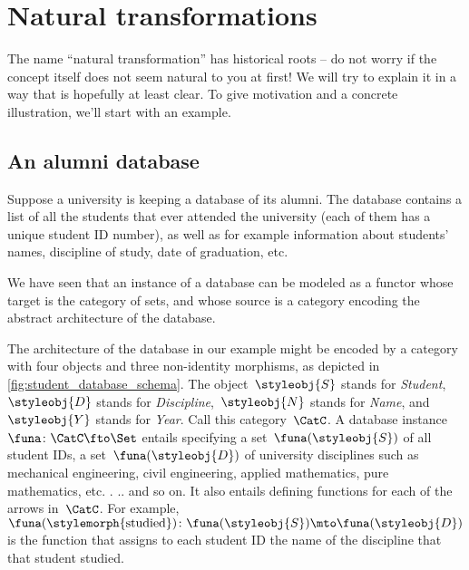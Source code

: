 
\section{Natural transformations}


The name ``natural transformation'' has historical roots -- do not worry if the concept itself does not seem natural to you at first!
We will try to explain it in a way that is hopefully at least clear.
To give motivation and a concrete illustration, we'll start with an example.

\subsection{An alumni database}

Suppose a university is keeping a database of its alumni.
The database contains a list of all the students that ever attended the university (each of them has a unique student ID number), as well as for example information about students' names, discipline of study, date of graduation, etc.

We have seen that an instance of a database can be modeled as a functor whose target is the category of sets, and whose source is a category encoding the abstract architecture of the database.

%
\begin{marginfigure}
    \centering
    \caption{}
    \label{fig:student_database_schema}
\end{marginfigure}
%

The architecture of the database in our example might be encoded by a category with four objects and three non-identity morphisms, as depicted in \cref{fig:student_database_schema}.
The object~$\styleobj{S}$ stands for \emph{Student},~$\styleobj{D}$ stands for \emph{Discipline},~$\styleobj{N}$ stands for \emph{Name}, and~$\styleobj{Y}$ stands for \emph{Year}.
Call this category~$\CatC$.
A database instance~$\funa \colon \CatC \fto \Set$ entails specifying a set~$\funa(\styleobj{S})$ of all student IDs, a set~$\funa(\styleobj{D})$ of university disciplines such as mechanical engineering, civil engineering, applied mathematics, pure mathematics, etc.
.
.. and so on.
It also entails defining functions for each of the arrows in~$\CatC$.
For example,~$\funa(\stylemorph{\text{studied}}) \colon \funa(\styleobj{S}) \mto \funa(\styleobj{D})$ is the function that assigns to each student ID the name of the discipline that that student studied.

